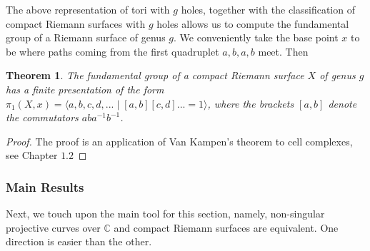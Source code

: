 \documentclass{article}
\theoremstyle{plain}
\newtheorem{theorem}{Theorem}[subsection]
\theoremstyle{definition}
\begin{document}
\noindent The above representation of tori with $g$ holes, together with the classification of compact Riemann surfaces with $g$ holes allows us to compute the fundamental group of a Riemann surface of genus $g$. 
We conveniently take the base point $x$ to be where paths coming from the first quadruplet $a,b,a,b$ meet. Then
\begin{theorem}
    The fundamental group of a compact Riemann surface $X$ of genus $g$ has a finite presentation of the form $\pi_1(X,x) = \langle a,b,c,d,...\mid [a,b][c,d]... = 1\rangle$, where the brackets $[a,b]$ denote the commutators $aba^{-1}b^{-1}$.
\end{theorem}
\begin{proof}
    The proof is an application of Van Kampen's theorem to cell complexes, see \cite{Hatcher} Chapter $1.2$
\end{proof}



\subsubsection{Main Results}


\noindent Next, we touch upon the main tool for this section, namely, non-singular projective curves over $\mathbb{C}$ and compact Riemann surfaces are equivalent. 
One direction is easier than the other.
\end{document}

